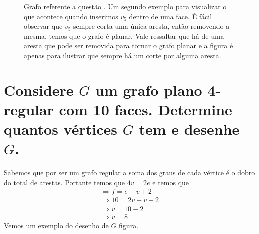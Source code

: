 \documentclass[a4paper,12pt]{article}
\begin{document}
	\begin{figure}[!ht]
		\centering
		\caption{Grafo referente a questão \thesection. Um segundo exemplo para visualizar o que acontece quando inserimos $v_5$ dentro de uma face. É fácil observar que $v_5$ sempre corta uma única aresta, então removendo a mesma, temos que o grafo é planar. Vale ressaltar que há de uma aresta que pode ser removida para tornar o grafo planar e a figura é apenas para ilustrar que sempre há um corte por alguma aresta.}
	\end{figure}

\section{Considere $G$ um grafo plano 4-regular com 10 faces. Determine quantos vértices $G$ tem e desenhe $G$.}
	Sabemos que por ser um grafo regular a soma dos graus de cada vértice é o dobro do total de arestas. Portante temos que $4v = 2e$ e temos que 
	\begin{eqnarray}
		\Rightarrow f = e - v + 2 \nonumber \\
		\Rightarrow 10 = 2v - v + 2 \nonumber\\
		\Rightarrow v = 10 - 2 \nonumber\\
		\Rightarrow v = 8 \nonumber
	\end{eqnarray}
	Vemos um exemplo do desenho de $G$ figura.
\end{document}
